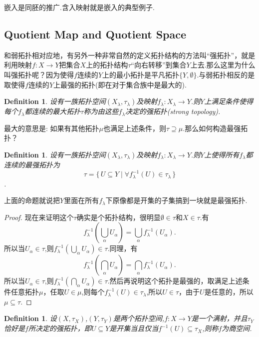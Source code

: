 \documentclass{article}
\newtheorem{definition}[theorem]{Definition}
\newcommand*{\xfunc}[4]{{#2}\colon{#3}{#1}{#4}}
\newcommand*{\func}[3]{\xfunc{\to}{#1}{#2}{#3}}
\newcommand\Set[2]{\{\,#1\mid#2\,\}} %
\begin{document}
嵌入是同胚的推广.含入映射就是嵌入的典型例子.


\newpage
\subsection{Quotient Map and Quotient Space}
和弱拓扑相对应地，有另外一种非常自然的定义拓扑结构的方法叫“强拓扑”，就是利用映射$\func{f}{X}{Y}$把集合$X$上的拓扑结构$\tau$“向右转移”到集合$Y$上去.那么这里为什么叫强拓扑呢？因为使得$f$连续的$Y$上的最小拓扑是平凡拓扑$\{Y,\emptyset\}$.与弱拓扑相反的是取使得$f$连续的$Y$上最强的拓扑(即在对于集合族中是最大的).


\begin{definition}
设有一族拓扑空间$(X_\lambda,\tau_\lambda)$及映射$\func{f_\lambda}{X_\lambda}{Y}$.则$Y$上满足条件使得每个$f_\lambda$都连续的最大拓扑$\tau$称为由这些$f_\lambda$决定的强拓扑(strong topology).
\end{definition}

最大的意思是: 如果有其他拓扑$\mu$也满足上述条件，则$\tau \supseteq \mu$.那么如何构造最强拓扑？

\begin{definition}
设有一族拓扑空间$(X_\lambda,\tau_\lambda)$及映射$\func{f_\lambda}{X_\lambda}{Y}$.则$Y$上使得所有$f_\lambda$都连续的最强拓扑为\[\tau = \Set{U \subseteq Y}{\forall f_\lambda^{-1}(U) \in \tau_\lambda}\].
\end{definition}

上面的命题就说把$Y$里面在所有$f_\lambda$下原像都是开集的子集搞到一块就是最强拓扑.

\begin{proof}
现在来证明这个$\tau$确实是个拓扑结构，很明显$\emptyset \in \tau$和$X \in \tau$.有\[f^{-1}_\lambda(\bigcup\limits_{\alpha} U_\alpha)=\bigcup\limits_\alpha f_\lambda^{-1}(U_\alpha).\]所以当$U_\alpha \in \tau$,则$f^{-1}_\lambda(\bigcup\limits_{\alpha} U_\alpha) \in \tau$.同理，有\[f^{-1}_\lambda(\bigcap\limits_{\alpha} U_\alpha)=\bigcap\limits_\alpha f_\lambda^{-1}(U_\alpha).\]所以当$U_\alpha \in \tau$,则$f^{-1}_\lambda(\bigcap\limits_{\alpha} U_\alpha) \in \tau$.然后再说明这个拓扑是最强的，取满足上述条件任意拓扑$\mu$，任取$U \in \mu$,则每个$f_\lambda^{-1}(U) \in \tau_\lambda$,所以$U \in \tau$，由于$U$是任意的，所以$\mu \subseteq \tau$.
\end{proof}

\begin{definition}
设$(X,\tau_X)$,$(Y,\tau_Y)$是两个拓扑空间,$\func{f}{X}{Y}$是一个满射，并且$\tau_Y$恰好是$f$所决定的强拓扑，即$U \subseteq Y$是开集当且仅当$f^{-1}(U) \subseteq \tau_X$,则称$f$为商空间.
\end{definition}
\end{document}
